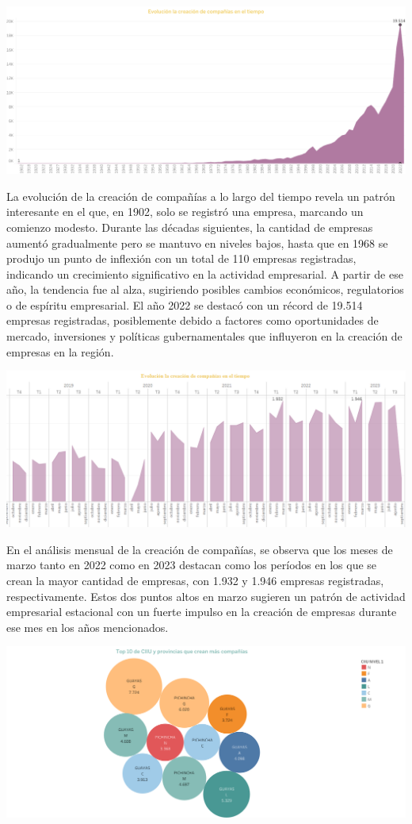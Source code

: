 \documentclass[
]{article}
\begin{document}
\includegraphics{imagenes/Hoja 11.png}

La evolución de la creación de compañías a lo largo del tiempo revela un
patrón interesante en el que, en 1902, solo se registró una empresa,
marcando un comienzo modesto. Durante las décadas siguientes, la
cantidad de empresas aumentó gradualmente pero se mantuvo en niveles
bajos, hasta que en 1968 se produjo un punto de inflexión con un total
de 110 empresas registradas, indicando un crecimiento significativo en
la actividad empresarial. A partir de ese año, la tendencia fue al alza,
sugiriendo posibles cambios económicos, regulatorios o de espíritu
empresarial. El año 2022 se destacó con un récord de 19.514 empresas
registradas, posiblemente debido a factores como oportunidades de
mercado, inversiones y políticas gubernamentales que influyeron en la
creación de empresas en la región.

\includegraphics{imagenes/GGBB.png}

En el análisis mensual de la creación de compañías, se observa que los
meses de marzo tanto en 2022 como en 2023 destacan como los períodos en
los que se crean la mayor cantidad de empresas, con 1.932 y 1.946
empresas registradas, respectivamente. Estos dos puntos altos en marzo
sugieren un patrón de actividad empresarial estacional con un fuerte
impulso en la creación de empresas durante ese mes en los años
mencionados.

\includegraphics{imagenes/Hoja 7.png}
\end{document}
